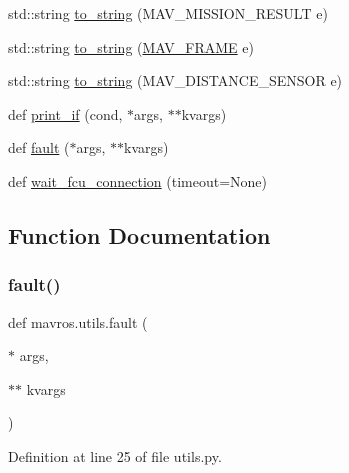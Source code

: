 \begin{DoxyCompactItemize}
std\+::string \mbox{\hyperlink{group__nodelib_ga239f977f7399f313bdb3bdb5b10d5e82}{to\+\_\+string}} (M\+A\+V\+\_\+\+M\+I\+S\+S\+I\+O\+N\+\_\+\+R\+E\+S\+U\+LT e)
\item 
std\+::string \mbox{\hyperlink{group__nodelib_gab4f14da7e17442ff8985ce2789c9a298}{to\+\_\+string}} (\mbox{\hyperlink{include__v0_89_2mavlink__types_8h_aae9266d97d838a375605b69000c60617}{M\+A\+V\+\_\+\+F\+R\+A\+ME}} e)
\item 
std\+::string \mbox{\hyperlink{group__nodelib_gaaea3adb4b5c17eaa45a8088779b1a8fc}{to\+\_\+string}} (M\+A\+V\+\_\+\+D\+I\+S\+T\+A\+N\+C\+E\+\_\+\+S\+E\+N\+S\+OR e)
\item 
def \mbox{\hyperlink{namespacemavros_1_1utils_aa2d9eadded6f99cef914eb38b8b388bc}{print\+\_\+if}} (cond, $\ast$args, $\ast$$\ast$kvargs)
\item 
def \mbox{\hyperlink{namespacemavros_1_1utils_a16d4e77af2c641d07e3c17143f0c458c}{fault}} ($\ast$args, $\ast$$\ast$kvargs)
\item 
def \mbox{\hyperlink{namespacemavros_1_1utils_a2131b38b8f613788e1186891c5d05c9c}{wait\+\_\+fcu\+\_\+connection}} (timeout=None)
\end{DoxyCompactItemize}


\subsection{Function Documentation}
\mbox{\label{namespacemavros_1_1utils_a16d4e77af2c641d07e3c17143f0c458c}} 
\subsubsection{\texorpdfstring{fault()}{fault()}}
{\footnotesize\ttfamily def mavros.\+utils.\+fault (\begin{DoxyParamCaption}\item[{$\ast$}]{args,  }\item[{$\ast$$\ast$}]{kvargs }\end{DoxyParamCaption})}



Definition at line 25 of file utils.\+py.

\mbox{\label{namespacemavros_1_1utils_aa2d9eadded6f99cef914eb38b8b388bc}} 
